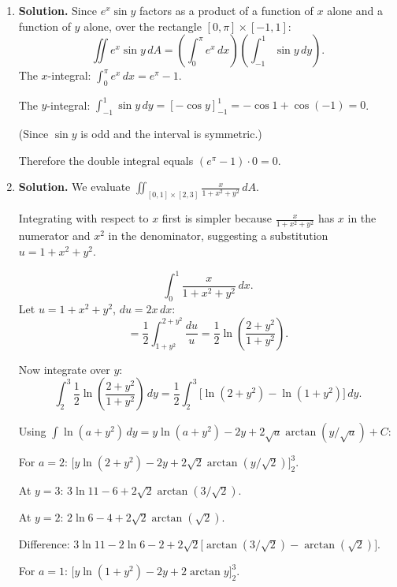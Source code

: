 \begin{enumerate}
\textbf{Order 1:} $dy\,dx$:
\[
\int_1^2\int_0^1 (3+2x)\,dy\,dx = \int_1^2 (3+2x)\,dx = \left[3x + x^2\right]_1^2 = (6+4)-(3+1) = \boxed{6}.
\]

\textbf{Order 2:} $dx\,dy$:
\[
\int_0^1\int_1^2 (3+2x)\,dx\,dy = \int_0^1\left[3x+x^2\right]_1^2 dy = \int_0^1 6\,dy = 6.
\]
Both orders yield $6$.

\item \textbf{Solution.}
Since $e^x\sin y$ factors as a product of a function of $x$ alone and a function of $y$ alone, over the rectangle $[0,\pi]\times[-1,1]$:
\[
\iint e^x\sin y\,dA = \left(\int_0^\pi e^x\,dx\right)\!\left(\int_{-1}^1 \sin y\,dy\right).
\]
The $x$-integral: $\int_0^\pi e^x\,dx = e^\pi - 1$.

The $y$-integral: $\int_{-1}^1 \sin y\,dy = [-\cos y]_{-1}^1 = -\cos 1 + \cos(-1) = 0$.

(Since $\sin y$ is odd and the interval is symmetric.)

Therefore the double integral equals $(e^\pi - 1)\cdot 0 = \boxed{0}$.

\item \textbf{Solution.}
We evaluate $\displaystyle\iint_{[0,1]\times[2,3]}\frac{x}{1+x^2+y^2}\,dA$.

Integrating with respect to $x$ first is simpler because $\frac{x}{1+x^2+y^2}$ has $x$ in the numerator and $x^2$ in the denominator, suggesting a substitution $u = 1+x^2+y^2$.

\[
\int_0^1\frac{x}{1+x^2+y^2}\,dx.
\]
Let $u = 1+x^2+y^2$, $du = 2x\,dx$:
\[
= \frac{1}{2}\int_{1+y^2}^{2+y^2}\frac{du}{u} = \frac{1}{2}\ln\!\left(\frac{2+y^2}{1+y^2}\right).
\]

Now integrate over $y$:
\[
\int_2^3 \frac{1}{2}\ln\!\left(\frac{2+y^2}{1+y^2}\right)\,dy = \frac{1}{2}\int_2^3\bigl[\ln(2+y^2)-\ln(1+y^2)\bigr]\,dy.
\]

Using $\int \ln(a+y^2)\,dy = y\ln(a+y^2) - 2y + 2\sqrt{a}\arctan(y/\sqrt{a}) + C$:

For $a=2$: $\bigl[y\ln(2+y^2) - 2y + 2\sqrt{2}\arctan(y/\sqrt{2})\bigr]_2^3$.

At $y=3$: $3\ln 11 - 6 + 2\sqrt{2}\arctan(3/\sqrt{2})$.

At $y=2$: $2\ln 6 - 4 + 2\sqrt{2}\arctan(\sqrt{2})$.

Difference: $3\ln 11 - 2\ln 6 - 2 + 2\sqrt{2}\bigl[\arctan(3/\sqrt{2})-\arctan(\sqrt{2})\bigr]$.

For $a=1$: $\bigl[y\ln(1+y^2)-2y+2\arctan y\bigr]_2^3$.


\end{enumerate}

